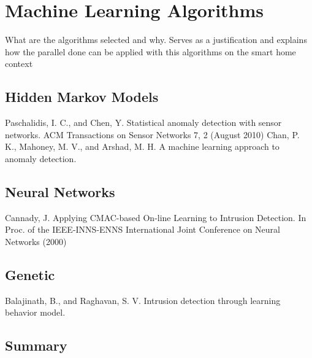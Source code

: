 
\chapter{Machine Learning Algorithms}

What are the algorithms selected and why.  Serves as a justification and explains how the parallel done can be applied with this algorithms on the smart home context

\section{Hidden Markov Models}
Paschalidis, I. C., and Chen, Y. Statistical anomaly detection with sensor networks. ACM Transactions on Sensor Networks 7, 2 (August 2010)
Chan, P. K., Mahoney, M. V., and Arshad, M. H.  A machine learning approach to anomaly detection.

\section{Neural Networks}
Cannady, J. Applying CMAC-based On-line Learning to Intrusion Detection. In Proc. of the IEEE-INNS-ENNS International Joint Conference on Neural Networks (2000)

\section{Genetic }
Balajinath, B., and Raghavan, S. V. Intrusion detection through learning behavior model.
	
\section{Summary}

